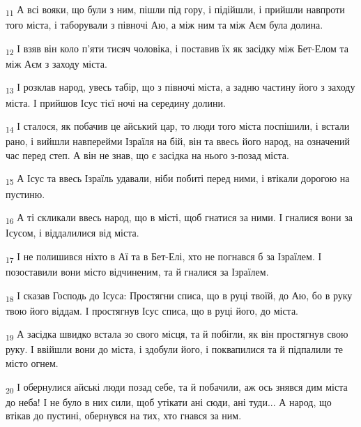 \begin{tcolorbox}
\textsubscript{11} А всі вояки, що були з ним, пішли під гору, і підійшли, і прийшли навпроти того міста, і таборували з півночі Аю, а між ним та між Аєм була долина.
\end{tcolorbox}
\begin{tcolorbox}
\textsubscript{12} І взяв він коло п'яти тисяч чоловіка, і поставив їх як засідку між Бет-Елом та між Аєм з заходу міста.
\end{tcolorbox}
\begin{tcolorbox}
\textsubscript{13} І розклав народ, увесь табір, що з півночі міста, а задню частину його з заходу міста. І прийшов Ісус тієї ночі на середину долини.
\end{tcolorbox}
\begin{tcolorbox}
\textsubscript{14} І сталося, як побачив це айський цар, то люди того міста поспішили, і встали рано, і вийшли навперейми Ізраїля на бій, він та ввесь його народ, на означений час перед степ. А він не знав, що є засідка на нього з-позад міста.
\end{tcolorbox}
\begin{tcolorbox}
\textsubscript{15} А Ісус та ввесь Ізраїль удавали, ніби побиті перед ними, і втікали дорогою на пустиню.
\end{tcolorbox}
\begin{tcolorbox}
\textsubscript{16} А ті скликали ввесь народ, що в місті, щоб гнатися за ними. І гналися вони за Ісусом, і віддалилися від міста.
\end{tcolorbox}
\begin{tcolorbox}
\textsubscript{17} І не полишився ніхто в Аї та в Бет-Елі, хто не погнався б за Ізраїлем. І позоставили вони місто відчиненим, та й гналися за Ізраїлем.
\end{tcolorbox}
\begin{tcolorbox}
\textsubscript{18} І сказав Господь до Ісуса: Простягни списа, що в руці твоїй, до Аю, бо в руку твою його віддам. І простягнув Ісус списа, що в руці його, до міста.
\end{tcolorbox}
\begin{tcolorbox}
\textsubscript{19} А засідка швидко встала зо свого місця, та й побігли, як він простягнув свою руку. І ввійшли вони до міста, і здобули його, і поквапилися та й підпалили те місто огнем.
\end{tcolorbox}
\begin{tcolorbox}
\textsubscript{20} І обернулися айські люди позад себе, та й побачили, аж ось знявся дим міста до неба! І не було в них сили, щоб утікати ані сюди, ані туди... А народ, що втікав до пустині, обернувся на тих, хто гнався за ним.
\end{tcolorbox}
